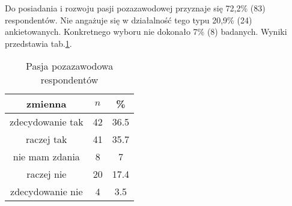 
Do posiadania i rozwoju pasji pozazawodowej przyznaje się 72,2\% (83) respondentów. Nie angażuje się w działalność tego typu 20,9\% (24) ankietowanych. Konkretnego wyboru nie dokonało 7\% (8) badanych. Wyniki przedstawia  tab.\ref{tab:Q23}.




\begin{table}[H]
\caption{Pasja pozazawodowa respondentów}
\centering
\begin{tabular}{ | c | c | c |}
\hline
zmienna & $n$ & \% \\
\hline
zdecydowanie tak  &  42  & 36.5\\
\hline
raczej tak  &  41  & 35.7\\
\hline
nie mam zdania  &  8  & 7 \\
\hline
raczej nie  &  20  & 17.4 \\
\hline
zdecydowanie nie  &  4  & 3.5\\
\hline
\end{tabular}
\label{tab:Q23}
\end{table}
